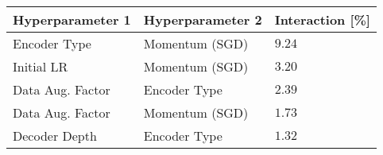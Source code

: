 \begin{tabular}{lll}
\toprule
Hyperparameter 1 & Hyperparameter 2 & Interaction [\%] \\
\midrule
Encoder Type & Momentum (SGD) & $9.24$ \\
Initial LR & Momentum (SGD) & $3.20$ \\
Data Aug. Factor & Encoder Type & $2.39$ \\
Data Aug. Factor & Momentum (SGD) & $1.73$ \\
Decoder Depth & Encoder Type & $1.32$ \\
\bottomrule
\end{tabular}
